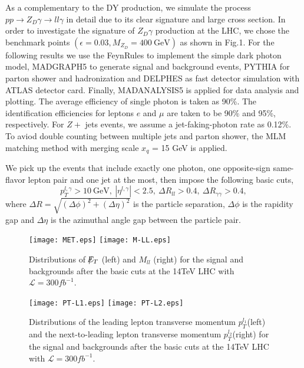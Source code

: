 \documentclass{article}
\begin{document}
 As a complementary to the DY production, we simulate the process $pp\rightarrow Z_D\gamma\rightarrow ll\gamma$ in detail due to its clear signature and large cross section.  In order to investigate the signature of $Z_D\gamma$ production at the LHC, we chose the 
 benchmark points $(\epsilon=0.03, M_{Z_D}=400\ \text{GeV})$  as shown in Fig.1.  For the following results we use the FeynRules\cite{FR} to implement the  simple dark photon  model\cite{1312.4992,1412.0018,0803.1243}, MADGRAPH5\cite{MG5} to generate signal and background events,  PYTHIA\cite{PYTHIA}  for parton shower and  hadronization and DELPHES\cite{DELPHES} as 
fast detector simulation with ATLAS detector card. Finally, MADANALYSIS5\cite{MA5} is applied for data analysis and plotting.
  The average efficiency of single photon is taken as 90\%. The identification efficiencies for leptons $e$ and $\mu$ are taken to be 90\% and 95\%, respectively. For $Z+$ jets events, we assume  a jet-faking-photon rate as 0.12\%. To aviod double counting between multiple jets and parton shower, the MLM matching method with merging scale $x_q$ = 15 GeV is applied.

  We pick up the events that include exactly one photon, one opposite-sign same-flavor lepton pair and one jet at the most, then impose the following  basic cuts,
\begin{equation}
p_T^{l,\gamma}>10 \ \text{GeV} ,\  \left | \eta^{l,\gamma} \right |<2.5,\ \Delta R_{ll}>0.4,\ \Delta R_{\gamma \gamma}>0.4,
\end{equation}
where $\Delta R=\sqrt{(\Delta\phi)^2+(\Delta\eta)^2}$ is the particle separation, $\Delta\phi$ is the rapidity gap and $\Delta\eta $ is the azimuthal angle gap between the particle pair.
\begin{figure}
\begin{center}
\texttt{[image: MET.eps]}
\texttt{[image: M-LL.eps]}
\caption{Distributions of $/\kern-0.65em E_T$ (left) and $M_{ll}$ (right) for the signal and backgrounds after the basic cuts at the  14TeV LHC with $\mathcal{L}=300 fb^{-1}$.}
\end{center}
\end{figure}

\begin{figure}
\begin{center}
\texttt{[image: PT-L1.eps]}
\texttt{[image: PT-L2.eps]}
\caption{Distributions of the leading lepton transverse momentum $p_T^{l_1}$(left) and the next-to-leading lepton transverse momentum $p_T^{l_2}$(right) for the signal and backgrounds after the basic cuts at the 14TeV LHC with $\mathcal{L}=300 fb^{-1}$.}
\end{center}
\end{figure}
\end{document}
